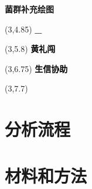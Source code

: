 \documentclass[
]{article}
\author{}
\date{\vspace{-2.5em}}
\begin{document}
\begin{titlepage} 
\begin{center} \textbf{\huge 菌群补充绘图}
\vspace{4em} \begin{textblock}{10}(3,4.85) \Large
\textbf{\textcolor{black}{_}}
\end{textblock} \begin{textblock}{10}(3,5.8)
\Large \textbf{\textcolor{black}{黄礼闯}}
\end{textblock} \begin{textblock}{10}(3,6.75)
\Large
\textbf{\textcolor{black}{生信协助}}
\end{textblock} \begin{textblock}{10}(3,7.7)
\Large
\textbf{\textcolor{black}{}}
\end{textblock} \end{center} \end{titlepage}
\restoregeometry


\begin{center}\vspace{1.5cm}\end{center}\tableofcontents

\begin{center}\vspace{1.5cm}\end{center}\listoffigures

\begin{center}\vspace{1.5cm}\end{center}\listoftables

\newpage


\hypertarget{abstract}{%
\section{分析流程}\label{abstract}}

\hypertarget{introduction}{%
\section{材料和方法}\label{introduction}}
\end{document}
